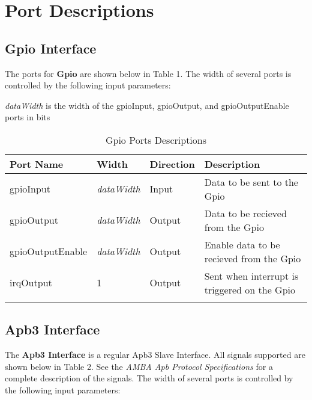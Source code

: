 \section{Port Descriptions}

\subsection{Gpio Interface}

The ports for \textbf{Gpio} are shown below in 
Table 1. The width of several ports is controlled 
by the following input parameters:

\textit{dataWidth} is the width of the gpioInput, gpioOutput, and gpioOutputEnable ports in bits
 
\renewcommand*{\arraystretch}{1.4}
\begin{longtable}[H]{
  | p{}
  | p{}
  | p{}
  | p{} |
  }
  \hline
  \textbf{Port Name} &   
  \textbf{Width} &   
  \textbf{Direction} &   
  \textbf{Description} \\ \hline \hline

  gpioInput &       
  \textit{dataWidth} & 
  Input &       
  Data to be sent to the Gpio\\ \hline

  gpioOutput &        
  \textit{dataWidth} & 
  Output &       
  Data to be recieved from the Gpio \\ \hline

  gpioOutputEnable &      
  \textit{dataWidth} & 
  Output &     
  Enable data to be recieved from the Gpio \\ \hline

  irqOutput &      
  1 & 
  Output &     
  Sent when interrupt is triggered on the Gpio \\ \hline
 
 
  \caption{Gpio Ports Descriptions}\label{table:ports}
\end{longtable}

\subsection{Apb3 Interface}
The \textbf{Apb3 Interface} is a regular Apb3 Slave Interface. All signals supported are shown below in 
Table 2. See the \textit{AMBA Apb Protocol Specifications} for a complete description of the signals. The width of several ports is controlled 
by the following input parameters:

